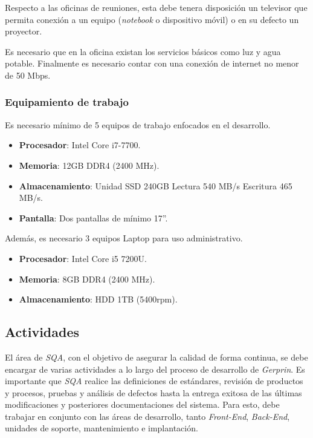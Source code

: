 Respecto a las oficinas de reuniones, esta debe tenera disposición un televisor que permita conexión a un equipo (\textit{notebook} o dispositivo móvil) o en su defecto un proyector.

Es necesario que en la oficina existan los servicios básicos como luz y agua potable. Finalmente es necesario contar con una conexión de internet no menor de 50 Mbps.

\subsubsection{Equipamiento de trabajo}

Es necesario mínimo de 5 equipos de trabajo enfocados en el desarrollo.

	\begin{itemize}
		\item 
		\textbf{Procesador}: Intel Core i7-7700.
		\item 
		\textbf{Memoria}: 12GB DDR4 (2400 MHz).
		\item 
		\textbf{Almacenamiento}: Unidad SSD 240GB Lectura 540 MB/s Escritura 465 MB/s.
		\item 
		\textbf{Pantalla}: Dos pantallas de mínimo 17”.
	\end{itemize}

Además, es necesario  3 equipos Laptop para uso administrativo. 

	\begin{itemize}
		\item 
		\textbf{Procesador}: Intel Core i5 7200U.
		\item 
		\textbf{Memoria}: 8GB DDR4 (2400 MHz).
		\item 
		\textbf{Almacenamiento}: HDD 1TB (5400rpm).
	\end{itemize}

\subsection{Actividades}

El área de \textit{SQA}, con el objetivo de asegurar la calidad de forma continua, se debe encargar de varias actividades a lo largo del proceso de desarrollo de \textit{Gerprin}. Es importante que \textit{SQA} realice las definiciones de estándares, revisión de productos y procesos, pruebas y análisis de defectos hasta la entrega exitosa de las últimas modificaciones y posteriores documentaciones del sistema. Para esto, debe trabajar en conjunto con las áreas de desarrollo, tanto \textit{Front-End}, \textit{Back-End}, unidades de soporte, mantenimiento e implantación.

